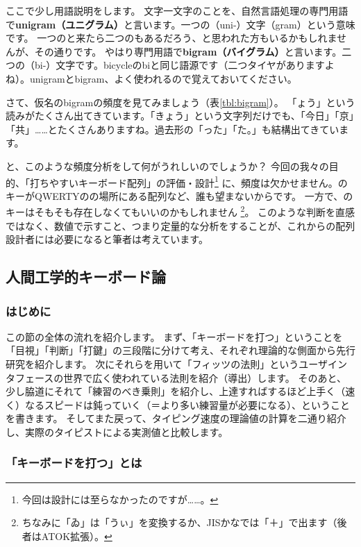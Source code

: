 ここで少し用語説明をします。
文字一文字のことを、自然言語処理の専門用語で{\bf unigram（ユニグラム）}と言います。一つの（uni-）文字（gram）という意味です。
一つのと来たら二つのもあるだろう、と思われた方もいるかもしれませんが、その通りです。
やはり専門用語で{\bf bigram（バイグラム）}と言います。二つの（bi-）文字です。bicycleのbiと同じ語源です（二つタイヤがありますよね）。unigramとbigram、よく使われるので覚えておいてください。

さて、仮名のbigramの頻度を見てみましょう（表\ref{tbl:bigram}）。
「ょう」という読みがたくさん出てきています。「きょう」という文字列だけでも、「今日」「京」「共」……とたくさんありますね。過去形の「った」「た。」も結構出てきています。

と、このような頻度分析をして何がうれしいのでしょうか？
今回の我々の目的、「打ちやすいキーボード配列」の評価・設計\footnote{今回は設計には至らなかったのですが……。}%
に、頻度は欠かせません。のキーがQWERTYのの場所にある配列など、誰も望まないからです。
一方で、のキーはそもそも存在しなくてもいいのかもしれません%
\footnote{ちなみに「ゐ」は「うぃ」を変換するか、JISかなでは「＋」で出ます（後者はATOK拡張）。}。
このような判断を直感ではなく、数値で示すこと、つまり定量的な分析をすることが、これからの配列設計者には必要になると筆者は考えています。

\subsection{人間工学的キーボード論}

\subsubsection*{はじめに}

この節の全体の流れを紹介します。
まず、「キーボードを打つ」ということを「目視」「判断」「打鍵」の三段階に分けて考え、それぞれ理論的な側面から先行研究を紹介します。
次にそれらを用いて「フィッツの法則」というユーザインタフェースの世界で広く使われている法則を紹介（導出）します。
そのあと、少し脇道にそれて「練習のべき乗則」を紹介し、上達すればするほど上手く（速く）なるスピードは鈍っていく（＝より多い練習量が必要になる）、ということを書きます。
そしてまた戻って、タイピング速度の理論値の計算を二通り紹介し、実際のタイピストによる実測値と比較します。

\subsubsection*{「キーボードを打つ」とは}

